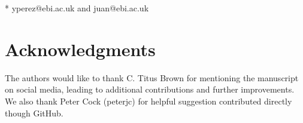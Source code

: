 \documentclass[10pt,letterpaper]{article}
\begin{document}
\begin{flushleft}
\bigskip

* yperez@ebi.ac.uk and juan@ebi.ac.uk

\end{flushleft}




\linenumbers



\section*{Acknowledgments}

The authors would like to thank C. Titus Brown for mentioning
the manuscript on social media, leading to additional contributions
and further improvements. We also thank Peter Cock (peterjc) for
helpful suggestion contributed directly though GitHub.

\nolinenumbers

 
\end{document}
